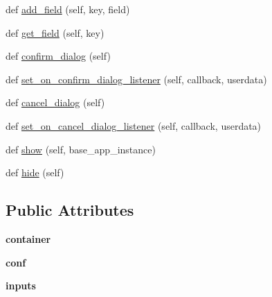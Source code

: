 \begin{DoxyCompactItemize}
def \hyperlink{classremi_1_1gui_1_1GenericDialog_aedb713b0aa165232509b5d64b56d93b7}{add\+\_\+field} (self, key, field)
\item 
def \hyperlink{classremi_1_1gui_1_1GenericDialog_abe3376922b34089d38e2af903708dc7f}{get\+\_\+field} (self, key)
\item 
def \hyperlink{classremi_1_1gui_1_1GenericDialog_afb62d4e48291115923d9dae74841a989}{confirm\+\_\+dialog} (self)
\item 
def \hyperlink{classremi_1_1gui_1_1GenericDialog_a255f09292492e190f01c87394fce2c15}{set\+\_\+on\+\_\+confirm\+\_\+dialog\+\_\+listener} (self, callback, userdata)
\item 
def \hyperlink{classremi_1_1gui_1_1GenericDialog_a23650c8959545f1a4c50b9b375f0412d}{cancel\+\_\+dialog} (self)
\item 
def \hyperlink{classremi_1_1gui_1_1GenericDialog_ae45abbd039d70a70f5134e843a7fb91e}{set\+\_\+on\+\_\+cancel\+\_\+dialog\+\_\+listener} (self, callback, userdata)
\item 
def \hyperlink{classremi_1_1gui_1_1GenericDialog_ad7ac0adef763e683bfc87a289392bb11}{show} (self, base\+\_\+app\+\_\+instance)
\item 
def \hyperlink{classremi_1_1gui_1_1GenericDialog_ab228c4ebfd696414b4a5c04f5ec55e67}{hide} (self)
\end{DoxyCompactItemize}
\subsection*{Public Attributes}
\begin{DoxyCompactItemize}
\item 
{\bfseries container}\hypertarget{classremi_1_1gui_1_1GenericDialog_a64988716e9f35b583d5b1a9c025b3883}{}\label{classremi_1_1gui_1_1GenericDialog_a64988716e9f35b583d5b1a9c025b3883}

\item 
{\bfseries conf}\hypertarget{classremi_1_1gui_1_1GenericDialog_a636108546940b87a6d27c6d4adbd1db9}{}\label{classremi_1_1gui_1_1GenericDialog_a636108546940b87a6d27c6d4adbd1db9}

\item 
{\bfseries inputs}\hypertarget{classremi_1_1gui_1_1GenericDialog_abc0f249b5d2364d36b504784c6d529e7}{}\label{classremi_1_1gui_1_1GenericDialog_abc0f249b5d2364d36b504784c6d529e7}

\end{DoxyCompactItemize}
